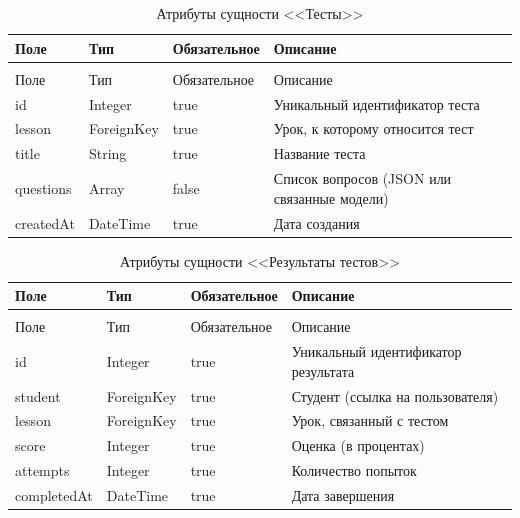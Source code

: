 \begin{xltabular}{\textwidth}{|l|l|p{3.2cm}|X|}
  \caption{Атрибуты сущности <<Тесты>>\label{tests:table}}\\ \hline
  Поле & Тип & Обязательное & Описание \\ \hline
  \endfirsthead
  \\ \hline
  Поле & Тип & Обязательное & Описание \\ \hline
  \endhead
  id & Integer & true & Уникальный идентификатор теста \\ \hline
  lesson & ForeignKey & true & Урок, к которому относится тест \\ \hline
  title & String & true & Название теста \\ \hline
  questions & Array & false & Список вопросов (JSON или связанные модели) \\ \hline
  createdAt & DateTime & true & Дата создания \\ \hline
\end{xltabular}

\begin{xltabular}{\textwidth}{|l|l|p{3.2cm}|X|}
  \caption{Атрибуты сущности <<Результаты тестов>>\label{test_results:table}}\\ \hline
  Поле & Тип & Обязательное & Описание \\ \hline
  \endfirsthead
  \\ \hline
  Поле & Тип & Обязательное & Описание \\ \hline
  \endhead
  id & Integer & true & Уникальный идентификатор результата \\ \hline
  student & ForeignKey & true & Студент (ссылка на пользователя) \\ \hline
  lesson & ForeignKey & true & Урок, связанный с тестом \\ \hline
  score & Integer & true & Оценка (в процентах) \\ \hline
  attempts & Integer & true & Количество попыток \\ \hline
  completedAt & DateTime & true & Дата завершения \\ \hline
\end{xltabular}

